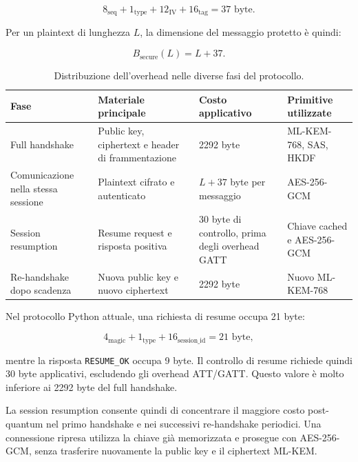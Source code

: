 \documentclass[11pt,a4paper]{article}
\begin{document}
\[
8_{\mathrm{seq}}
+
1_{\mathrm{type}}
+
12_{\mathrm{IV}}
+
16_{\mathrm{tag}}
=
37 \text{ byte}.
\]

Per un plaintext di lunghezza $L$, la dimensione del messaggio protetto è
quindi:

\[
B_{\mathrm{secure}}(L) = L + 37.
\]

\begin{table}[H]
    \centering
    \small
    \caption{Distribuzione dell'overhead nelle diverse fasi del protocollo.}
    \label{tab:protocol-overhead-distribution}
    \begin{tabular}{p{3.5cm}p{4.1cm}p{3.2cm}p{3.3cm}}
        \hline
        \textbf{Fase} &
        \textbf{Materiale principale} &
        \textbf{Costo applicativo} &
        \textbf{Primitive utilizzate} \\
        \hline

        Full handshake &
        Public key, ciphertext e header di frammentazione &
        2292 byte &
        ML-KEM-768, SAS, HKDF \\

        Comunicazione nella stessa sessione &
        Plaintext cifrato e autenticato &
        $L + 37$ byte per messaggio &
        AES-256-GCM \\

        Session resumption &
        Resume request e risposta positiva &
        30 byte di controllo, prima degli overhead GATT &
        Chiave cached e AES-256-GCM \\

        Re-handshake dopo scadenza &
        Nuova public key e nuovo ciphertext &
        2292 byte &
        Nuovo ML-KEM-768 \\
        \hline
    \end{tabular}
\end{table}

Nel protocollo Python attuale, una richiesta di resume occupa 21 byte:

\[
4_{\mathrm{magic}}
+
1_{\mathrm{type}}
+
16_{\mathrm{session\_id}}
=
21 \text{ byte},
\]

mentre la risposta \texttt{RESUME\_OK} occupa 9 byte. Il controllo di
resume richiede quindi 30 byte applicativi, escludendo gli overhead
ATT/GATT. Questo valore è molto inferiore ai 2292 byte del full
handshake.

La session resumption consente quindi di concentrare il maggiore costo
post-quantum nel primo handshake e nei successivi re-handshake
periodici. Una connessione ripresa utilizza la chiave già memorizzata e
prosegue con AES-256-GCM, senza trasferire nuovamente la public key e il
ciphertext ML-KEM.
\end{document}
